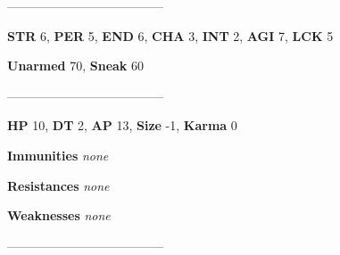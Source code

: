 \documentclass[11pt,a4paper,twocolumn]{book}
\begin{document}
%		
%	
%		

	--------------------------------------
	
	\noindent
	\textbf{STR} 6, \textbf{PER} 5, \textbf{END} 6, \textbf{CHA} 3, \textbf{INT} 2, \textbf{AGI} 7, \textbf{LCK} 5
	
	\noindent
	\textbf{Unarmed} 70, \textbf{Sneak} 60
	
	--------------------------------------
	
	\noindent
	\textbf{HP} 10, \textbf{DT} 2, \textbf{AP} 13, \textbf{Size} -1, \textbf{Karma} 0
	
	
	\noindent
	\textbf{Immunities} \emph{none}
	
	\noindent
	\textbf{Resistances} \emph{none}
	
	\noindent
	\textbf{Weaknesses} \emph{none} %
	
	--------------------------------------
	
\end{document}
